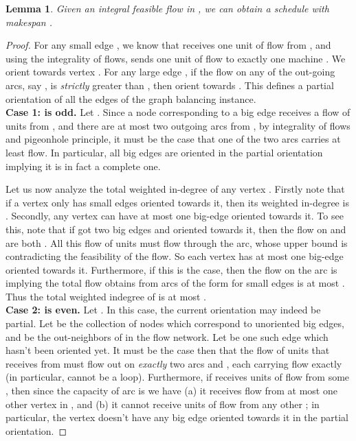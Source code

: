 \documentclass[11pt]{article}
\newtheorem{lemma}{Lemma}
\begin{document}
\begin{lemma}\label{lem:3}
	Given an integral feasible flow in , we can obtain a schedule with makespan .
\end{lemma}
\begin{proof}
For any small edge , we know that  receives one unit of flow from , and using the integrality of flows,  sends one unit of flow to exactly one machine . We orient  towards vertex .
    For any large edge , if the flow on any of the out-going arcs, say ,  is {\em strictly} greater than , then orient  towards .  This defines a partial orientation of all the edges of the graph balancing instance. \\
    
   \noindent
    {\bf Case 1:  is odd.} Let . Since a node  corresponding to a big edge  receives a flow of  units from , and there are at most two outgoing arcs from , 
    by integrality of flows and pigeonhole principle, it must be the case that one of the two arcs  carries at least  flow. In particular, all big edges are oriented in the partial orientation implying it is in fact a complete one.
   
   Let us now analyze the total weighted in-degree of any vertex .  Firstly note that if a vertex  only has small edges oriented towards it, then its weighted in-degree is . 
Secondly, any vertex  can have at most one big-edge oriented towards it. To see this, note that if  got two big edges  and  oriented towards it, then the flow on  and  are both . All this flow of  units must flow through the  arc, whose upper bound is  contradicting the feasibility of the flow. So each vertex  has at most one big-edge oriented towards it.  Furthermore, if this is the case, then the flow on the  arc is  implying the total flow  obtains from arcs of the form  for small edges  is at most . Thus the total weighted indegree of  is at most .\\ 
   	
\noindent
	{\bf Case 2:  is even.} Let . In this case, the current orientation may indeed be partial.
	Let  be the collection of nodes  which correspond to unoriented big edges, and  be the out-neighbors of  in the flow network. 
	Let  be one such edge which hasn't been oriented yet. It must be the case then that the flow of  units that  receives from  must flow out 
	on {\em exactly} two arcs  and , each carrying flow exactly  (in particular,  cannot be a loop).
	Furthermore, if  receives  units of flow from some , then since the capacity of  arc is  we have (a) it receives flow from at most one other vertex in ,
	and (b)	it cannot receive  units of flow from any other ; in particular, the vertex  doesn't have any big edge oriented towards it in the partial orientation.
	

\end{proof}
\end{document}
